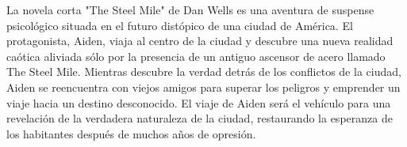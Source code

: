 
La novela corta "The Steel Mile" de Dan Wells es una aventura de suspense psicológico situada en el futuro distópico de una ciudad de América. El protagonista, Aiden, viaja al centro de la ciudad y descubre una nueva realidad caótica aliviada sólo por la presencia de un antiguo ascensor de acero llamado The Steel Mile. Mientras descubre la verdad detrás de los conflictos de la ciudad, Aiden se reencuentra con viejos amigos para superar los peligros y emprender un viaje hacia un destino desconocido. El viaje de Aiden será el vehículo para una revelación de la verdadera naturaleza de la ciudad, restaurando la esperanza de los habitantes después de muchos años de opresión.